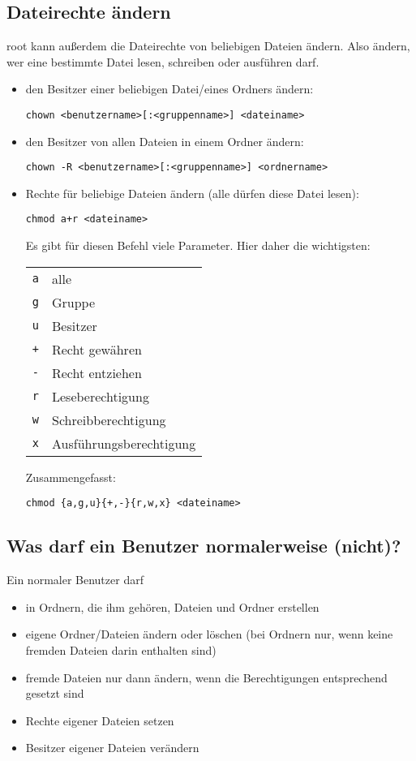 \documentclass[a4paper,12pt]{article}
\begin{document}
\subsection{Dateirechte ändern}
root kann außerdem die Dateirechte von beliebigen Dateien ändern. Also ändern, 
wer eine bestimmte Datei lesen, schreiben oder ausführen darf.  
\begin{itemize}
\item den Besitzer einer beliebigen Datei/eines Ordners ändern:
\begin{lstlisting}
chown <benutzername>[:<gruppenname>] <dateiname>
\end{lstlisting} 
\item den Besitzer von allen Dateien in einem Ordner ändern:
\begin{lstlisting}
chown -R <benutzername>[:<gruppenname>] <ordnername>
\end{lstlisting} 
\item Rechte für beliebige Dateien ändern (alle dürfen diese Datei lesen):
\begin{lstlisting}
chmod a+r <dateiname>
\end{lstlisting} 
Es gibt für diesen Befehl viele Parameter. Hier daher die wichtigsten:
\begin{center}
\begin{tabular}{ll}
\texttt{a} & alle \\
\texttt{g} & Gruppe \\
\texttt{u} & Besitzer \\
\texttt{+} & Recht gewähren \\
\texttt{-} & Recht entziehen \\
\texttt{r} & Leseberechtigung \\
\texttt{w} & Schreibberechtigung \\
\texttt{x} & Ausführungsberechtigung \\
\end{tabular}
\end{center} 
Zusammengefasst:
\begin{lstlisting}
chmod {a,g,u}{+,-}{r,w,x} <dateiname>
\end{lstlisting} 

\end{itemize}   

\subsection{Was darf ein Benutzer normalerweise (nicht)?}
Ein normaler Benutzer darf 
\begin{itemize}
\item in Ordnern, die ihm gehören, Dateien und Ordner erstellen
\item eigene Ordner/Dateien ändern oder löschen (bei Ordnern nur, wenn 
keine fremden Dateien darin enthalten sind)
\item fremde Dateien nur dann ändern, wenn die Berechtigungen entsprechend gesetzt sind
\item Rechte eigener Dateien setzen
\item Besitzer eigener Dateien verändern
\end{itemize}
\end{document}
